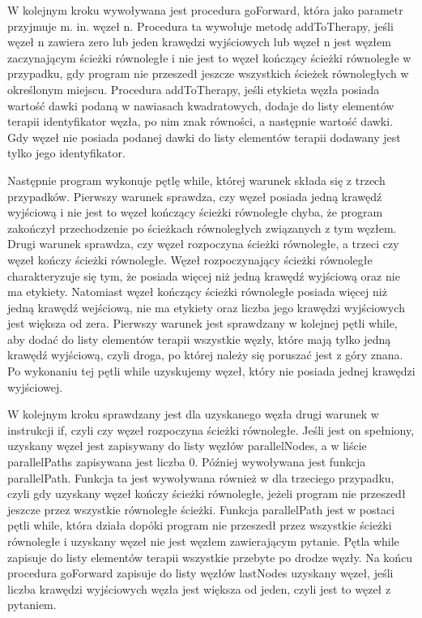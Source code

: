 \documentclass[oneside,a4paper]{book}
\begin{document}
\begin{spacing}{1.5}
W kolejnym kroku wywoływana jest procedura goForward, która jako parametr przyjmuje m. in. węzeł n. Procedura ta wywołuje metodę addToTherapy, jeśli węzeł n zawiera zero lub jeden krawędzi wyjściowych lub węzeł n jest węzłem zaczynającym ścieżki równoległe i nie jest to węzeł kończący ścieżki równoległe w przypadku, gdy program nie przeszedł jeszcze wszystkich ścieżek równoległych w określonym miejscu. Procedura addToTherapy, jeśli etykieta węzła posiada wartość dawki podaną w nawiasach kwadratowych, dodaje do listy elementów terapii identyfikator węzła, po nim znak równości, a następnie wartość dawki. Gdy węzeł nie posiada podanej dawki do listy elementów terapii dodawany jest tylko jego identyfikator. 

Następnie program wykonuje pętlę while, której warunek składa się z trzech przypadków. Pierwszy warunek sprawdza, czy węzeł posiada jedną krawędź wyjściową i nie jest to węzeł kończący ścieżki równoległe chyba, że program zakończył przechodzenie po ścieżkach równoległych związanych z tym węzłem. Drugi warunek sprawdza, czy węzeł rozpoczyna ścieżki równoległe, a trzeci czy węzeł kończy ścieżki równoległe. Węzeł rozpoczynający ścieżki równoległe charakteryzuje się tym, że posiada więcej niż jedną krawędź wyjściową oraz nie ma etykiety. Natomiast węzeł kończący ścieżki równoległe posiada więcej niż jedną krawędź wejściową, nie ma etykiety oraz liczba jego krawędzi wyjściowych jest większa od zera. Pierwszy warunek jest sprawdzany w kolejnej pętli while, aby dodać do listy elementów terapii wszystkie węzły, które mają tylko jedną krawędź wyjściową, czyli droga, po której należy się poruszać jest z góry znana. Po wykonaniu tej pętli while uzyskujemy węzeł, który nie posiada jednej krawędzi wyjściowej.

W kolejnym kroku sprawdzany jest dla uzyskanego węzła drugi warunek w instrukcji if, czyli czy węzeł rozpoczyna ścieżki równoległe. Jeśli jest on spełniony, uzyskany węzeł jest zapisywany do listy węzłów parallelNodes, a w liście parallelPaths zapisywana jest liczba 0. Później wywoływana jest funkcja parallelPath. Funkcja ta jest wywoływana również w dla trzeciego przypadku, czyli gdy uzyskany węzeł kończy ścieżki równoległe, jeżeli program nie przeszedł jeszcze przez wszystkie równoległe ścieżki. Funkcja parallelPath jest w postaci pętli while, która działa dopóki program nie przeszedł przez wszystkie ścieżki równoległe i uzyskany węzeł nie jest węzłem zawierającym pytanie. Pętla while zapisuje do listy elementów terapii wszystkie przebyte po drodze węzły. Na końcu procedura goForward zapisuje do listy węzłów lastNodes uzyskany węzeł, jeśli liczba krawędzi wyjściowych węzła jest większa od jeden, czyli jest to węzeł z pytaniem.


\end{spacing}
\end{document}
